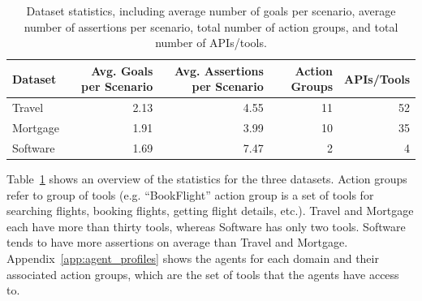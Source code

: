 \begin{table}[t]
    \caption{Dataset statistics, including average number of goals per scenario, average number of assertions per scenario, total number of action groups, and total number of APIs/tools.}
    \label{tab:dataset_stats}
    \centering
    \footnotesize
    \begin{tabular}{lrrrr}
    \toprule
     Dataset & Avg. Goals per Scenario & Avg. Assertions per Scenario & Action Groups & APIs/Tools \\
     \midrule
     Travel & 2.13 & 4.55 & 11 & 52 \\
     Mortgage & 1.91 & 3.99 & 10 & 35 \\
     Software & 1.69 & 7.47 & 2 & 4 \\
     \bottomrule
     \end{tabular}
\end{table}


Table~\ref{tab:dataset_stats} shows an overview of the statistics for the three datasets. Action groups refer to group of tools (e.g. ``BookFlight'' action group is a set of tools for searching flights, booking flights, getting flight details, etc.). Travel and Mortgage each have more than thirty tools, whereas Software has only two tools. Software tends to have more assertions on average than Travel and Mortgage. Appendix~\ref{app:agent_profiles} shows the agents for each domain and their associated action groups, which are the set of tools that the agents have access to.



